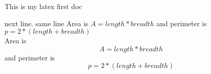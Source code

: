 \documentclass[11pt]{article}
\begin{document}
This is my latex first doc

next line.
same line
Area is $A=length*breadth$ and perimeter is $p=2*(length+breadth)$\\ 
Area is $$A=length*breadth$$ and perimeter is $$p=2*(length+breadth)$$
\end{document}
